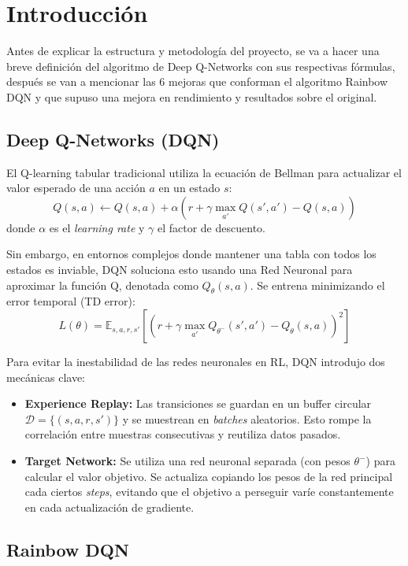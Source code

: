 \documentclass[onecolumn]{cwpreport} %
\begin{document}
\section{Introducción}

Antes de explicar la estructura y metodología del proyecto, se va a hacer una breve definición del algoritmo de Deep Q-Networks con sus respectivas fórmulas, después se van a mencionar las 6 mejoras que conforman el algoritmo Rainbow DQN y que supuso una mejora en rendimiento y resultados sobre el original. 
\subsection{Deep Q-Networks (DQN)}

El Q-learning tabular tradicional utiliza la ecuación de Bellman para actualizar el valor esperado de una acción $a$ en un estado $s$:
\[
    Q(s, a) \leftarrow Q(s, a) + \alpha \left( r + \gamma \max_{a'} Q(s', a') - Q(s, a) \right)
\]
donde $\alpha$ es el \textit{learning rate} y $\gamma$ el factor de descuento. 

Sin embargo, en entornos complejos donde mantener una tabla con todos los estados es inviable, DQN \citep{DQN} soluciona esto usando una Red Neuronal para aproximar la función Q, denotada como $Q_\theta(s, a)$. Se entrena minimizando el error temporal (TD error):
\[
    L(\theta) = \mathbb{E}_{s, a, r, s'} \left[ \left( r + \gamma \max_{a'} Q_{\theta^-}(s', a') - Q_\theta(s, a) \right)^2 \right]
\]

Para evitar la inestabilidad de las redes neuronales en RL, DQN introdujo dos mecánicas clave:
\begin{itemize}
    \item \textbf{Experience Replay:} Las transiciones se guardan en un buffer circular $\mathcal{D} = \{(s, a, r, s')\}$ y se muestrean en \textit{batches} aleatorios. Esto rompe la correlación entre muestras consecutivas y reutiliza datos pasados.
    \item \textbf{Target Network:} Se utiliza una red neuronal separada (con pesos $\theta^-$) para calcular el valor objetivo. Se actualiza copiando los pesos de la red principal cada ciertos \textit{steps}, evitando que el objetivo a perseguir varíe constantemente en cada actualización de gradiente.
\end{itemize}

\subsection{Rainbow DQN}
\end{document}
